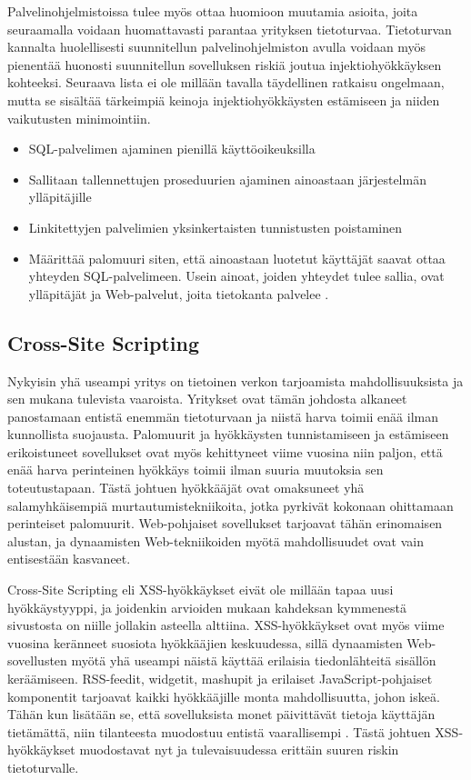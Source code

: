 Palvelinohjelmistoissa tulee myös ottaa huomioon muutamia asioita, joita seuraamalla voidaan huomattavasti parantaa yrityksen tietoturvaa.
Tietoturvan kannalta huolellisesti suunnitellun palvelinohjelmiston avulla voidaan myös pienentää huonosti suunnitellun sovelluksen riskiä joutua injektiohyökkäyksen kohteeksi. 
Seuraava lista ei ole millään tavalla täydellinen ratkaisu ongelmaan,
mutta se sisältää tärkeimpiä keinoja injektiohyökkäysten estämiseen ja
niiden vaikutusten minimointiin.

\begin{itemize}
\item SQL-palvelimen ajaminen pienillä käyttöoikeuksilla
\item Sallitaan tallennettujen proseduurien ajaminen ainoastaan järjestelmän ylläpitäjille
\item Linkitettyjen palvelimien yksinkertaisten tunnistusten poistaminen
\item Määrittää palomuuri siten, että ainoastaan luotetut käyttäjät saavat ottaa yhteyden SQL-palvelimeen. Usein ainoat, joiden yhteydet 
      tulee sallia, ovat ylläpitäjät ja Web-palvelut, joita tietokanta palvelee \cite{SQLSS}.
\end{itemize}


\subsection{Cross-Site Scripting}
Nykyisin yhä useampi yritys on tietoinen verkon tarjoamista mahdollisuuksista ja sen mukana tulevista vaaroista. Yritykset ovat tämän johdosta
alkaneet panostamaan entistä enemmän tietoturvaan ja niistä harva toimii enää ilman kunnollista suojausta. Palomuurit ja hyökkäysten tunnistamiseen
ja estämiseen erikoistuneet sovellukset ovat myös kehittyneet viime vuosina niin paljon, että enää harva perinteinen hyökkäys toimii ilman
suuria muutoksia sen toteutustapaan. Tästä johtuen hyökkääjät ovat omaksuneet yhä salamyhkäisempiä murtautumistekniikoita, jotka pyrkivät kokonaan
ohittamaan perinteiset palomuurit. Web-pohjaiset sovellukset tarjoavat tähän erinomaisen alustan, ja dynaamisten Web-tekniikoiden myötä mahdollisuudet 
ovat vain entisestään kasvaneet.

Cross-Site Scripting eli XSS-hyökkäykset eivät ole millään tapaa uusi hyökkäystyyppi, ja joidenkin arvioiden mukaan kahdeksan kymmenestä sivustosta on 
niille jollakin asteella alttiina. XSS-hyökkäykset ovat myös viime vuosina keränneet suosiota hyökkääjien keskuudessa, sillä dynaamisten Web-sovellusten
myötä yhä useampi näistä käyttää erilaisia tiedonlähteitä sisällön keräämiseen. RSS-feedit, widgetit, mashupit ja erilaiset JavaScript-pohjaiset komponentit 
tarjoavat kaikki hyökkääjille monta mahdollisuutta, johon iskeä. Tähän kun lisätään se, että sovelluksista monet päivittävät tietoja käyttäjän tietämättä, 
niin tilanteesta muodostuu entistä vaarallisempi \cite{WEB2b}. Tästä johtuen XSS-hyökkäykset muodostavat nyt ja tulevaisuudessa erittäin suuren riskin
tietoturvalle.

